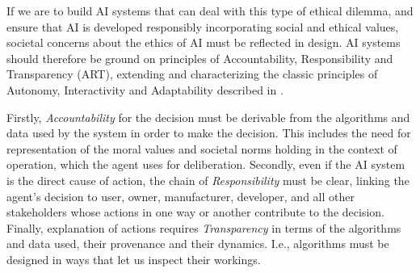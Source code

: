 \documentclass[twocolumn]{article}
\begin{document}
If we are to build AI systems that can deal with this type of ethical dilemma, and ensure that AI is developed responsibly incorporating social and ethical values, societal concerns about the ethics of AI must be reflected in design.  AI systems should therefore be ground on  principles of Accountability, Responsibility and Transparency (ART), extending and characterizing the classic  principles of Autonomy, Interactivity and Adaptability described in \cite{floridi2004morality,russell2009norvig}.

Firstly, \textit{Accountability} for the decision must be derivable from the algorithms and data used by the system in order to make the decision. This includes the need for representation of the moral values and societal norms holding in the context of operation, which the agent uses for deliberation. Secondly, even if the AI system is the direct cause of action, the chain of \textit{Responsibility} must be clear, linking the agent's decision to user, owner, manufacturer, developer, and all other stakeholders whose actions in one way or another contribute to the decision. %
Finally, explanation of actions requires \textit{Transparency} in terms of the algorithms and data used, their provenance and their dynamics. I.e., algorithms must be designed in ways that let us inspect their workings.
\end{document}

